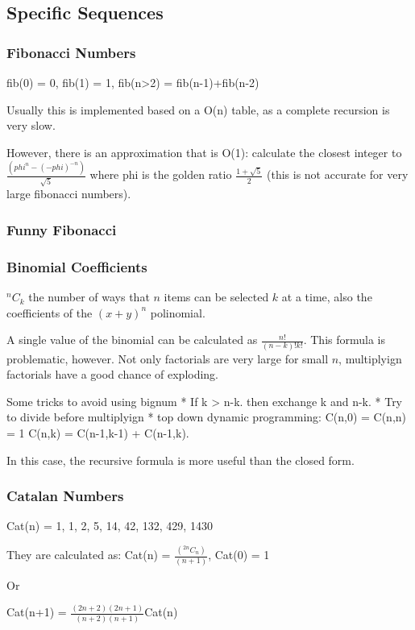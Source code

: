 \documentclass{beamer}
\begin{document}
\subsection{Specific Sequences}
\begin{frame}
  \frametitle{Fibonacci Numbers}
  
  fib(0) = 0, fib(1) = 1, fib(n>2) = fib(n-1)+fib(n-2)

  Usually this is implemented based on a O(n) table, as a complete recursion is very slow.

  However, there is an approximation that is O(1): calculate the
  closest integer to $\frac{(phi^n - (-phi)^{-n})}{\sqrt{5}}$ where phi is the golden ratio
  $\frac{1+\sqrt{5}}{2}$ (this is not accurate for very large fibonacci numbers).
\end{frame}

\begin{frame}
  \frametitle{Funny Fibonacci}

\end{frame}

\begin{frame}
  \frametitle{Binomial Coefficients}
  $^nC_k$ the number of ways that $n$ items can be selected $k$ at a time, also the coefficients of 
  the $(x+y)^n$ polinomial.

  A single value of the binomial can be calculated as
  $\frac{n!}{(n-k)!k!}$. This formula is problematic, however. Not
  only factorials are very large for small $n$, multiplyign factorials
  have a good chance of exploding.

  Some tricks to avoid using bignum
  * If k > n-k. then exchange k and n-k.
  * Try to divide before multiplyign
  * top down dynamic programming: C(n,0) = C(n,n) = 1
  C(n,k) = C(n-1,k-1) + C(n-1,k). 

  In this case, the recursive formula is more useful than the closed form.
\end{frame}

\begin{frame}
  \frametitle{Catalan Numbers}

  Cat(n) = 1, 1, 2, 5, 14, 42, 132, 429, 1430

  They are calculated as: 
  Cat(n) = $\frac{(^{2n}C_n)}{(n+1)}$, Cat(0) = 1

  Or

  Cat(n+1) = $\frac{(2n+2)(2n+1)}{(n+2)(n+1)}$Cat(n)

\end{frame}
\end{document}
